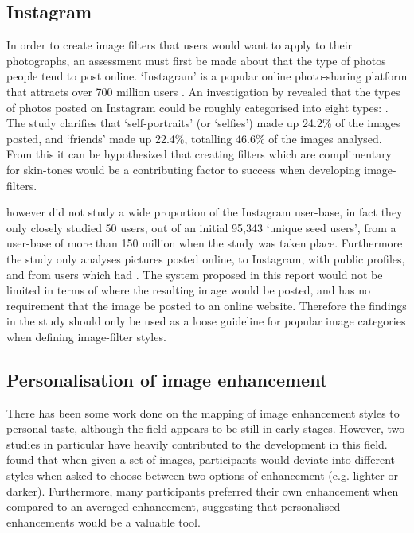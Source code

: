 \documentclass[a4paper,12pt]{report}
\begin{document}
    \subsection{Instagram} \label{sec:lit-insta}
      In order to create image filters that users would want to apply to their photographs, an assessment must first be made about that the type of photos people tend to post online. ‘Instagram’ is a popular online photo-sharing platform that attracts over 700 million users \citep{instagram2017users}. An investigation by \cite{hu2014we} revealed that the types of photos posted on Instagram could be roughly categorised into eight types: . The study clarifies that ‘self-portraits’ (or ‘selfies’) made up 24.2\% of the images posted, and ‘friends’ made up 22.4\%, totalling 46.6\% of the images analysed. From this it can be hypothesized that creating filters which are complimentary for skin-tones would be a contributing factor to success when developing image-filters.

      \cite{hu2014we} however did not study a wide proportion of the Instagram user-base, in fact they only closely studied 50 users, out of an initial 95,343 ‘unique seed users’, from a user-base of more than 150 million when the study was taken place. Furthermore the study only analyses pictures posted online, to Instagram, with public profiles, and from users which had . The system proposed in this report would not be limited in terms of where the resulting image would be posted, and has no requirement that the image be posted to an online website. Therefore the findings in the study should only be used as a loose guideline for popular image categories when defining image-filter styles.

    \subsection{Personalisation of image enhancement}
      There has been some work done on the mapping of image enhancement styles to personal taste, although the field appears to be still in early stages. However, two studies in particular have heavily contributed to the development in this field. \cite{kang2010personalization} found that when given a set of images, participants would deviate into different styles when asked to choose between two options of enhancement (e.g. lighter or darker). Furthermore, many participants preferred their own enhancement when compared to an averaged enhancement, suggesting that personalised enhancements would be a valuable tool.
\end{document}
